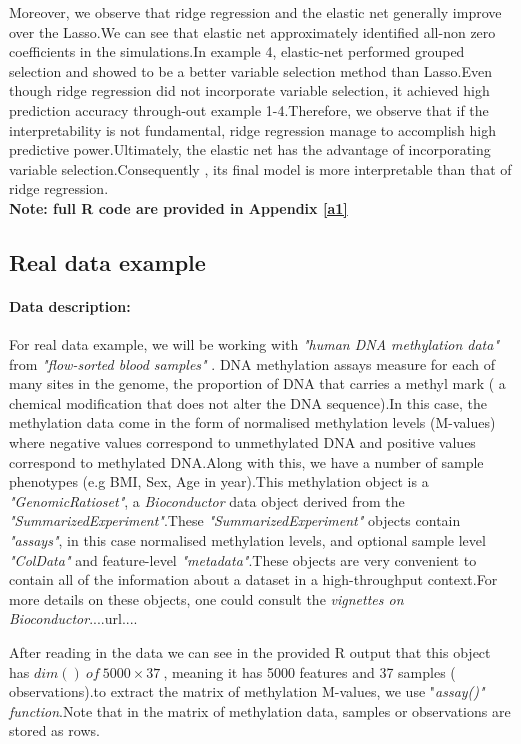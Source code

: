 \documentclass[12pt]{report}
\begin{document}
Moreover, we observe that ridge regression and the elastic net generally improve over the Lasso.We can see that elastic net approximately identified all-non zero coefficients in the simulations.In example 4, elastic-net performed grouped selection and showed to be a better variable selection method than Lasso.Even though ridge regression did not incorporate variable selection, it achieved high prediction accuracy through-out example 1-4.Therefore, we observe that if the interpretability is not fundamental, ridge regression manage to accomplish high predictive power.Ultimately, the elastic net has the advantage of incorporating variable selection.Consequently , its final model is more interpretable than that of ridge regression.\\
\textbf{Note: full R code are provided in Appendix \ref{a1}}
\subsection{Real data example}
\paragraph{Data description:}
For real data example, we will be working with \textit{"human DNA methylation data"} from \textit{"flow-sorted blood samples"} \cite{nref33}. DNA methylation assays measure for each of many sites in the genome, the proportion of DNA that carries a methyl mark ( a chemical modification that does not alter the DNA sequence).In this case, the methylation data come in the form of normalised methylation levels (M-values) where negative values correspond to unmethylated DNA and positive values correspond to methylated DNA.Along with this, we have a number of sample phenotypes (e.g BMI, Sex, Age in year).This methylation object is a \textit{"GenomicRatioset"}, a \textit{Bioconductor}\cite{nref31} data object derived from the \textit{"SummarizedExperiment"}\cite{nref32}.These \textit{"SummarizedExperiment"} objects contain  \textit{"assays"}, in this case normalised methylation levels, and optional sample level \textit{"ColData"} and feature-level \textit{"metadata"}.These objects are very convenient to contain all of the information about a dataset in a high-throughput context.For more details on these objects, one could consult the \textit{vignettes on Bioconductor}....url....

After reading in the data we can see in the provided R output that this object has $dim() \ of\ 5000\times37\ $, meaning it has 5000 features and 37 samples ( observations).to extract the matrix of methylation M-values, we use "\textit{assay()" function}.Note that in the matrix of methylation data, samples or observations are stored as rows.
\end{document}
